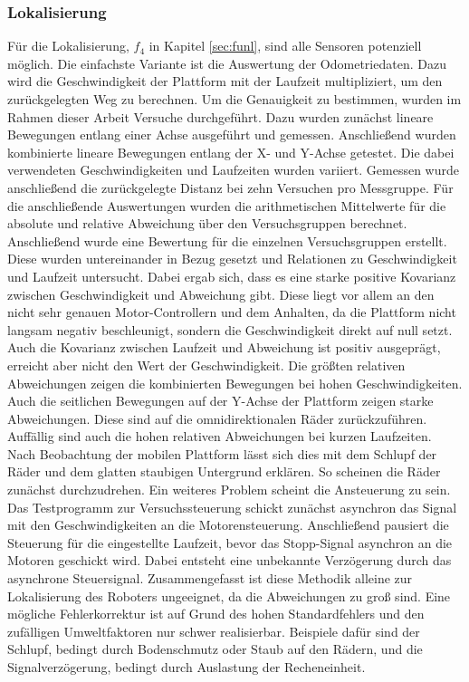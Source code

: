 \subsubsection{Lokalisierung}
\label{seq:lok}
Für die Lokalisierung, $f_4$ in Kapitel \ref{sec:funl}, sind alle Sensoren potenziell möglich. Die einfachste Variante ist die Auswertung der Odometriedaten. Dazu wird die Geschwindigkeit der Plattform mit der Laufzeit multipliziert, um den zurückgelegten Weg zu berechnen. Um die Genauigkeit zu bestimmen, wurden im Rahmen dieser Arbeit Versuche durchgeführt. Dazu wurden zunächst lineare Bewegungen entlang einer Achse ausgeführt und gemessen. Anschließend wurden kombinierte lineare Bewegungen entlang der X- und Y-Achse getestet. Die dabei verwendeten Geschwindigkeiten und Laufzeiten wurden variiert. Gemessen wurde anschließend die zurückgelegte Distanz bei zehn Versuchen pro Messgruppe. Für die anschließende Auswertungen wurden die arithmetischen Mittelwerte für die absolute und relative Abweichung über den Versuchsgruppen berechnet. Anschließend wurde eine Bewertung für die einzelnen Versuchsgruppen erstellt. Diese wurden untereinander in Bezug gesetzt und Relationen zu Geschwindigkeit und Laufzeit untersucht. Dabei ergab sich, dass es eine starke positive Kovarianz zwischen Geschwindigkeit und Abweichung gibt. Diese liegt vor allem an den nicht sehr genauen Motor-Controllern und dem Anhalten, da die Plattform nicht langsam negativ beschleunigt, sondern die Geschwindigkeit direkt auf null setzt. Auch die Kovarianz zwischen Laufzeit und Abweichung ist positiv ausgeprägt, erreicht aber nicht den Wert der Geschwindigkeit. Die größten relativen Abweichungen zeigen die kombinierten Bewegungen bei hohen Geschwindigkeiten. Auch die seitlichen Bewegungen auf der Y-Achse der Plattform zeigen starke Abweichungen. Diese sind auf die omnidirektionalen Räder zurückzuführen. Auffällig sind auch die hohen relativen Abweichungen bei kurzen Laufzeiten. Nach Beobachtung der mobilen Plattform lässt sich dies mit dem Schlupf der Räder und dem glatten staubigen Untergrund erklären. So scheinen die Räder zunächst durchzudrehen. Ein weiteres Problem scheint die Ansteuerung zu sein. Das Testprogramm zur Versuchssteuerung schickt zunächst asynchron das Signal mit den Geschwindigkeiten an die Motorensteuerung. Anschließend pausiert die Steuerung für die eingestellte Laufzeit, bevor das Stopp-Signal asynchron an die Motoren geschickt wird. Dabei entsteht eine unbekannte Verzögerung durch das asynchrone Steuersignal. Zusammengefasst ist diese Methodik alleine zur Lokalisierung des Roboters ungeeignet, da die Abweichungen zu groß sind. Eine mögliche Fehlerkorrektur ist auf Grund des hohen Standardfehlers und den zufälligen Umweltfaktoren nur schwer realisierbar. Beispiele dafür sind  der Schlupf, bedingt durch Bodenschmutz oder Staub auf den Rädern, und die Signalverzögerung, bedingt durch Auslastung der Recheneinheit.

